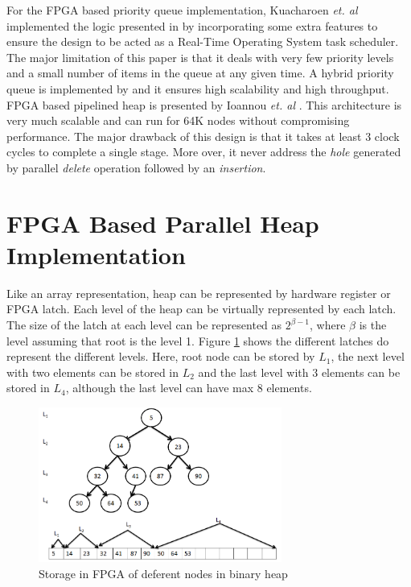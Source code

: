 \documentclass[10pt, conference, compsocconf]{IEEEtran}
\begin{document}
For the FPGA based priority queue implementation,  Kuacharoen {\it et. al} \cite{fpga3} implemented the logic presented in \cite{hw3} by incorporating some extra features to ensure the design to be acted as a Real-Time Operating System task scheduler. The major limitation of this paper is that it deals with very few priority levels and a small number of items in the queue at any given time. A hybrid priority queue is implemented by \cite{fpga2} and it ensures high scalability and high throughput. FPGA based pipelined heap is presented by Ioannou {\it et. al} \cite{fpga1}. This architecture is very much scalable and can run for 64K nodes without compromising performance. The major drawback of this design is that it takes at least 3 clock cycles to complete a single stage. More over, it never address the {\it hole} generated by parallel {\it delete} operation followed by an {\it insertion}.

\section{FPGA Based Parallel Heap Implementation}
Like an array representation, heap can be represented by hardware register or FPGA latch. Each level of the heap can be virtually represented by each latch. The size of the latch at each level can be represented as $2^{\beta-1}$, where $\beta$ is the level assuming that root is the level 1. Figure \ref{fig5} shows the different latches do represent the different levels. Here, root node can be stored by $L_1$, the next level with two elements can be stored in $L_2$ and the last level with 3 elements can be stored in $L_4$, although the last level can have max 8 elements.

\begin{figure}[h]
  \centering
  \includegraphics[width=8cm]{Figures/5.png}
      \caption{Storage in FPGA of deferent nodes in binary heap}
    \label{fig5}
\end{figure}
\end{document}
